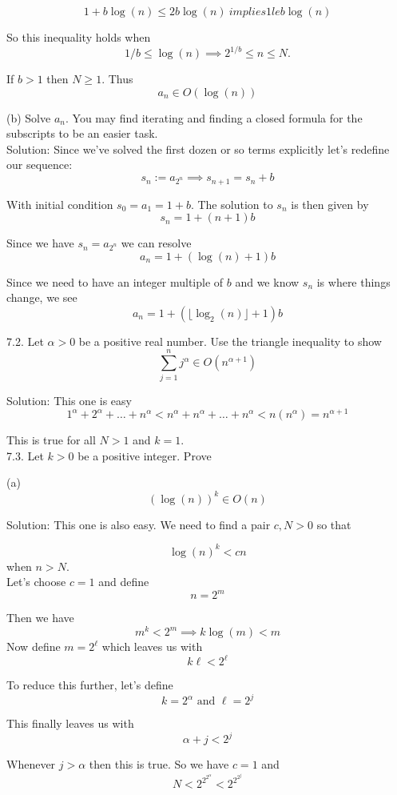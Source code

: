 \documentclass[16 pt]{amsart}
\theoremstyle{definition}
\theoremstyle{remark}
\numberwithin{equation}{subsection}
\begin{document}
\[
1 + b\log(n) \le 2b \log(n) \ implies 1 le b \log(n)
\]

So this inequality holds when
\[
1/b \le \log(n) \implies 2^{1/b} \le n \le N.
\]

If $b>1$ then $N\ge 1.$ Thus 
\[
a_n \in O(\log(n))
\]


(b) Solve $a_n$. You may find iterating and finding a closed formula for the subscripts to be an easier task.\\


Solution: Since we've solved the first dozen or so terms explicitly let's redefine our sequence:
\[
s_n := a_{2^n} \implies s_{n+1} = s_n + b
\]

With initial condition $s_0 = a_1 = 1+b$.  The solution to $s_n$ is then given by
\[
s_n = 1 + (n+1)b
\]

Since we have $s_n = a_{2^n}$ we can resolve
\[
a_n = 1 + (\log(n)+1)b
\]

Since we need to have an integer multiple of $b$ and we know $s_n$ is where things change, we see
\[
a_n = 1 + (\lfloor\log_2(n)\rfloor +1 ) b
\]



7.2. Let $\alpha>0$ be a positive real number.  Use the triangle inequality to show
\[
\sum_{j=1}^{n} j^{\alpha} \in O(n^{\alpha+1})
\]


Solution: This one is easy
\[
1^{\alpha} + 2^{\alpha} + \dots + n^{\alpha} < n^{\alpha} + n^{\alpha} + \dots + n^{\alpha} < n(n^{\alpha}) = n^{\alpha+1}
\]

This is true for all $N>1$ and $k=1$.\\


7.3. Let $k>0$ be a positive integer.  Prove

(a)
\[
(\log(n))^k \in O(n)
\]  


Solution:  This one is also easy.  We need to find a pair $c,N>0$ so that

\[
\log(n)^k < cn 
\]
when $n>N$.\\

Let's choose $c=1$ and define
\[
n = 2^m
\]

Then we have
\[
m^k < 2^m \implies k \log(m) < m
\]
Now define  $m=2^{\ell}$ which leaves us with
\[
k\ell < 2^{\ell}
\]

To reduce this further, let's define
\[
k = 2^{\alpha} \text{ and } \ell = 2^j
\]

This finally leaves us with
\[
\alpha + j < 2^j
\]

Whenever $j>\alpha$ then this is true. So we have $c=1$ and 
\[
N < 2^{2^{2^{\alpha}}}< 2^{2^{2^j}}
\]
\end{document}
